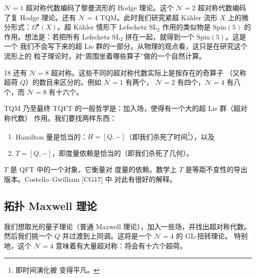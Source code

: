 $\mathcal{N}=1$ 超对称代数编码了黎曼流形的 Hodge 理论。这个 $\mathcal{N}=2$
超对称代数编码了复 Hodge 理论。还有 $\mathcal{N}=4$ TQM。此时我们研究紧超
Kähler 流形 $X$ 上的微分形式：$\Omega^{\bullet}(X)$。超 Kähler 情形下 Lefschetz
$\mathrm{SL}_{2}$ 作用的类似物是 $\mathrm{Spin}(5)$ 的作用。想法是：若把所有
Lefschetz $\mathrm{SL}_{2}$ 拼在一起，就得到一个 $\mathrm{Spin}(5)$。这是一个
我们不会写下来的超 Lie 群的一部分。从物理的观点看，这只是在研究这个流形上的
粒子理论时，对“周围坐着哪些算子”做的一个自然计算。

\begin{srcrem}{18}
还有 $\mathcal{N}=8$ 超对称。这些不同的超对称代数实际上是按存在的奇算子
（又称超荷 $Q$）的数目来区分的。例如 $\mathcal{N}=1$ 有两个，
$\mathcal{N}=2$ 有四个，$\mathcal{N}=4$ 有八个，而 $\mathcal{N}=8$ 有十六个。
\end{srcrem}



TQM 乃至最终 TQFT 的一般哲学是：加入场，使得有一个大的超 Lie 群（超对称代数）
作用。我们要找两样东西：
\begin{enumerate}
\item Hamilton 量是恰当的：$H=[Q,-]$（即我们杀死了时间\footnote{即时间演化被
变得平凡。}），以及
\item $T=[Q,-]$，即度量依赖是恰当的（即我们杀死了几何）。
\end{enumerate}
 $T$ 是 QFT 中的一个对象，它衡量对
度量的依赖。数学上 $T$ 是等距不变性的导出版本。Costello--Gwilliam [CG17] 中
对此有很好的解释。

\subsection{拓扑 Maxwell 理论}
\label{sec:4-8-1}

我们想取光的量子理论（普通 Maxwell 理论），加入一些场，并找出超对称代数。
然后我们挑一个 $Q$ 并过渡到上同调。这将是一个 $\mathcal{N}=4$ 的 GL-扭转理论。
特别地，这个 $\mathcal{N}=4$ 意味着有大量超对称：将会有十六个超荷。

